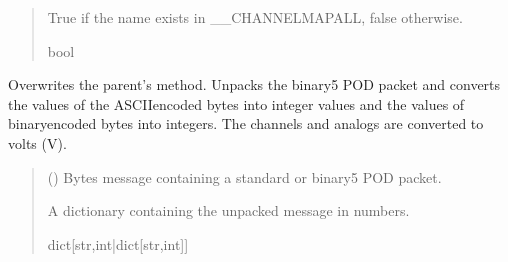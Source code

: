\documentclass[letterpaper,10pt,english]{sphinxmanual}
\begin{document}
\begin{fulllineitems}
\begin{fulllineitems}
\begin{quote}
\begin{description}
\sphinxAtStartPar
True if the name exists in \_\_CHANNELMAPALL, false otherwise.

\sphinxAtStartPar
bool

\end{description}\end{quote}

\end{fulllineitems}


\begin{fulllineitems}
\label{\detokenize{PodDevice_8401HR:PodDevice_8401HR.POD_8401HR.TranslatePODpacket}}
\pysigstartsignatures
{}
\pysigstopsignatures
\sphinxAtStartPar
Overwrites the parent’s method. Unpacks the binary5 POD packet and converts the values of the         ASCII\sphinxhyphen{}encoded bytes into integer values and the values of binary\sphinxhyphen{}encoded bytes into integers. The         channels and analogs are converted to volts (V).
\begin{quote}\begin{description}
\sphinxAtStartPar
{} () \textendash{} Bytes message containing a standard or binary5 POD packet.

\sphinxAtStartPar
A dictionary containing the unpacked message in numbers.

\sphinxAtStartPar
dict{[}str,int|dict{[}str,int{]}{]}

\end{description}\end{quote}

\end{fulllineitems}



\end{fulllineitems}
\end{document}
